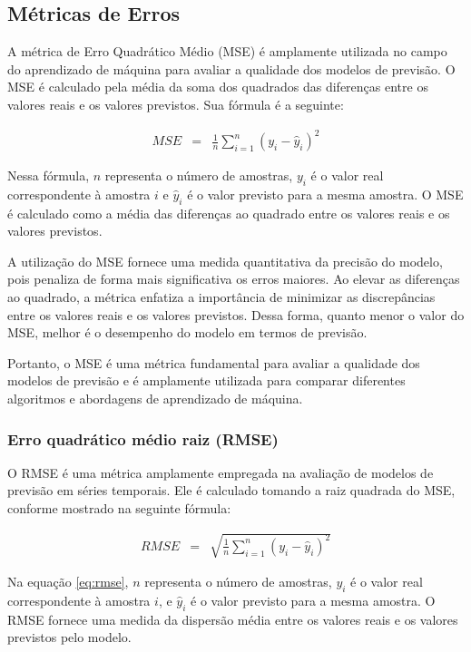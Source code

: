 \subsection{M\'etricas de Erros}\label{subsec:metrica}


A métrica de Erro Quadrático Médio (MSE) é amplamente utilizada no campo do aprendizado de máquina para avaliar a qualidade dos modelos de previsão. O MSE é calculado pela média da soma dos quadrados das diferenças entre os valores reais e os valores previstos. Sua fórmula é a seguinte:

\begin{eqnarray}
	MSE &=& \frac{1}{n} \sum_{i=1}^{n} (y_i - \hat{y}_i)^2 \label{eq:mse}
\end{eqnarray}

Nessa fórmula, $n$ representa o número de amostras, $y_i$ é o valor real correspondente à amostra $i$ e $\hat{y}_i$ é o valor previsto para a mesma amostra. O MSE é calculado como a média das diferenças ao quadrado entre os valores reais e os valores previstos.

A utilização do MSE fornece uma medida quantitativa da precisão do modelo, pois penaliza de forma mais significativa os erros maiores. Ao elevar as diferenças ao quadrado, a métrica enfatiza a importância de minimizar as discrepâncias entre os valores reais e os valores previstos. Dessa forma, quanto menor o valor do MSE, melhor é o desempenho do modelo em termos de previsão.

Portanto, o MSE é uma métrica fundamental para avaliar a qualidade dos modelos de previsão e é amplamente utilizada para comparar diferentes algoritmos e abordagens de aprendizado de máquina.

\subsubsection{Erro quadr\'atico m\'edio raiz (RMSE)}

O RMSE é uma métrica amplamente empregada na avaliação de modelos de previsão em séries temporais. Ele é calculado tomando a raiz quadrada do MSE, conforme mostrado na seguinte fórmula:

\begin{eqnarray}
	RMSE &=& \sqrt{\frac{1}{n} \sum_{i=1}^{n} (y_i - \hat{y}_i)^2} \label{eq:rmse}
\end{eqnarray}

Na equação \eqref{eq:rmse}, $n$ representa o número de amostras, $y_i$ é o valor real correspondente à amostra $i$, e $\hat{y}_i$ é o valor previsto para a mesma amostra. O RMSE fornece uma medida da dispersão média entre os valores reais e os valores previstos pelo modelo.


